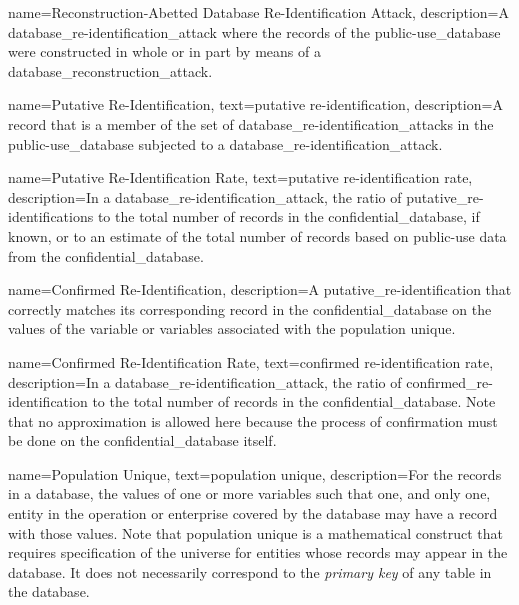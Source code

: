 {
    name=Reconstruction-Abetted Database Re-Identification Attack,
    description={A \gls{database_re-identification_attack} where the \glspl{record} of the \gls{public-use_database} were constructed in whole or in part by means of a \gls{database_reconstruction_attack}.}
}

{
    name=Putative Re-Identification,
    text=putative re-identification,
    description={A \gls{record} that is a member of the set of \glspl{database_re-identification_attack} in the \gls{public-use_database} subjected to a \gls{database_re-identification_attack}.}
}

{
    name=Putative Re-Identification Rate,
    text=putative re-identification rate,
    description={In a \gls{database_re-identification_attack}, the ratio of \glspl{putative_re-identification} to the total number of \glspl{record} in the \gls{confidential_database}, if known, or to an estimate of the total number of records based on public-use data from the \gls{confidential_database}.}
}

{
    name=Confirmed Re-Identification,
    description={A \gls{putative_re-identification} that correctly matches its corresponding \gls{record} in the \gls{confidential_database} on the values of the variable or variables associated with the population unique.}
}

{
    name=Confirmed Re-Identification Rate,
    text=confirmed re-identification rate,
    description={In a \gls{database_re-identification_attack}, the ratio of \gls{confirmed_re-identification} to the total number of \glspl{record} in the \gls{confidential_database}. Note that no approximation is allowed here because the process of confirmation must be done on the \gls{confidential_database} itself.}
}

{
    name=Population Unique,
    text=population unique,
    description={For the \glspl{record} in a \gls{database}, the values of one or more variables such that one, and only one, entity in the operation or enterprise covered by the database may have a record with those values. Note that population unique is a mathematical construct that requires specification of the universe for entities whose records may appear in the database. It does not necessarily correspond to the \textit{primary key} of any table in the database.}
}

